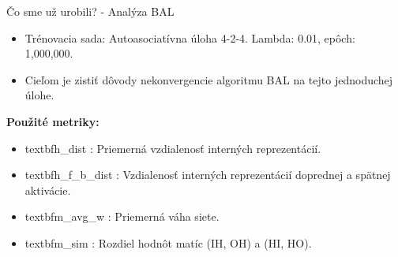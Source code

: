 \documentclass[xcolor=dvipsnames]{beamer}
\begin{document}
\begin{frame}{Čo sme už urobili? - Analýza BAL}
  \begin{itemize}
    \item Trénovacia sada: Autoasociatívna úloha 4-2-4. Lambda: 0.01, epôch: 1,000,000. 
    \item Cieľom je zistiť dôvody nekonvergencie algoritmu BAL na tejto jednoduchej úlohe.
  \end{itemize} 

  \textbf{Použité metriky:}

  \begin{itemize}
    \item textbf{h\_dist} : Priemerná vzdialenosť interných reprezentácií.   
    \item textbf{h\_f\_b\_dist} : Vzdialenosť interných reprezentácií doprednej a spätnej aktivácie. 
    \item textbf{m\_avg\_w}  : Priemerná váha siete. 
    \item textbf{m\_sim} : Rozdiel hodnôt matíc (IH, OH) a (HI, HO). 
  \end{itemize} 
\end{frame}
  
\end{document}
